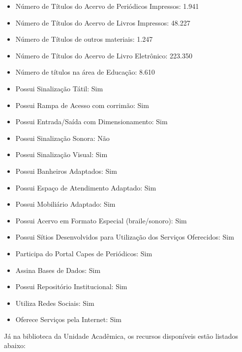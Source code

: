 \documentclass[
	12pt,				%
	openright,			%
  oneside,     %
	a4paper,			%
	chapter=TITLE,		%
	english,			%
	french,				%
	spanish,			%
	brazil				%
	]{abntex2}
\begin{document}
\begin{itemize}
    \item Número de Títulos do Acervo de Periódicos Impressos: 1.941
    \item Número de Títulos do Acervo de Livros Impressos: 48.227
    \item Número de Títulos de outros materiais: 1.247
    \item Número de Títulos do Acervo de Livro Eletrônico: 223.350
    \item Número de títulos na área de Educação: 8.610
    \item Possui Sinalização Tátil: Sim
    \item Possui Rampa de Acesso com corrimão: Sim
    \item Possui Entrada/Saída com Dimensionamento: Sim
    \item Possui Sinalização Sonora: Não
    \item Possui Sinalização Visual: Sim
    \item Possui Banheiros Adaptados: Sim
    \item Possui Espaço de Atendimento Adaptado: Sim
    \item Possui Mobiliário Adaptado: Sim
    \item Possui Acervo em Formato Especial (braile/sonoro): Sim
    \item Possui Sítios Desenvolvidos para Utilização dos Serviços Oferecidos: Sim
    \item Participa do Portal Capes de Periódicos: Sim
    \item Assina Bases de Dados: Sim
    \item Possui Repositório Institucional: Sim
    \item Utiliza Redes Sociais: Sim
    \item Oferece Serviços pela Internet: Sim
\end{itemize}

Já na biblioteca da Unidade Acadêmica, os recursos disponíveis estão listados abaixo:
\end{document}
